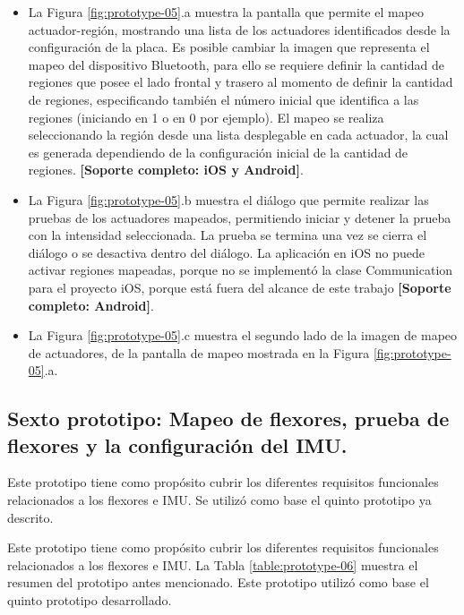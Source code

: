 \begin{itemize}

\item La Figura \ref{fig:prototype-05}.a muestra la pantalla que permite el mapeo actuador-región, mostrando una lista de los actuadores identificados desde la configuración de la placa. Es posible cambiar la imagen que representa el mapeo del dispositivo Bluetooth, para ello se requiere definir la cantidad de regiones que posee el lado frontal y trasero al momento de definir la cantidad de regiones, especificando también el número inicial que identifica a las regiones (iniciando en 1 o en 0 por ejemplo). El mapeo se realiza seleccionando la región desde una lista desplegable en cada actuador, la cual es generada dependiendo de la configuración inicial de la cantidad de regiones. \textbf{[Soporte completo: iOS y Android]}.

\item La Figura \ref{fig:prototype-05}.b muestra el diálogo que permite realizar las pruebas de los actuadores mapeados, permitiendo iniciar y detener la prueba con la intensidad seleccionada. La prueba se termina una vez se cierra el diálogo o se desactiva dentro del diálogo. La aplicación en iOS no puede activar regiones mapeadas, porque no se implementó la clase Communication para el proyecto iOS, porque está fuera del alcance de este trabajo \textbf{[Soporte completo: Android]}.

\item La Figura \ref{fig:prototype-05}.c muestra el segundo lado de la imagen de mapeo de actuadores, de la pantalla de mapeo mostrada en la Figura \ref{fig:prototype-05}.a.

\end{itemize}




\subsection{Sexto  prototipo: Mapeo de flexores, prueba de flexores y la configuración del IMU.}
\label{sexto-prototipo}
Este prototipo tiene como propósito cubrir los diferentes requisitos funcionales relacionados a los flexores e IMU. Se utilizó como base el quinto prototipo ya descrito. 

Este prototipo tiene como propósito cubrir los diferentes requisitos funcionales relacionados a los flexores e IMU.  La Tabla \ref{table:prototype-06} muestra el resumen del prototipo antes mencionado. Este prototipo utilizó como base el quinto prototipo desarrollado.

